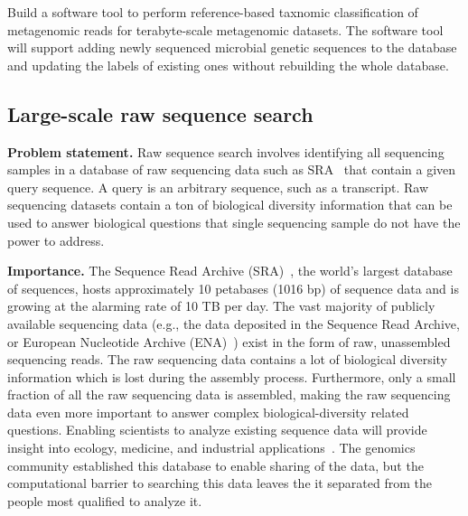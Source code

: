 \begin{rproblem}
Build a software tool to perform reference-based taxnomic classification of metagenomic reads for terabyte-scale metagenomic datasets. The software tool will support adding newly sequenced microbial genetic sequences to the database and updating the labels of existing ones without rebuilding the whole database.
\label{rprob:taxo-meta}
\end{rproblem}



\subsection{Large-scale raw sequence search}

{\bf Problem statement.} Raw sequence search involves identifying all sequencing samples in a database of raw sequencing data such as SRA~\cite{kodama2012sequence,KatzSLKBO22} that contain a given query sequence. A query is an arbitrary sequence, such as a transcript. Raw sequencing datasets contain a ton of biological diversity information that can be used to answer biological questions that single sequencing sample do not have the power to address.

\noindent
{\bf Importance.}
The Sequence Read Archive (SRA)~\cite{kodama2012sequence}, the world’s largest database of sequences, hosts approximately 10 petabases (1016 bp) of sequence data and is growing at the alarming rate of 10 TB per day.
%
The vast majority of publicly available sequencing data (e.g., the data deposited in the Sequence Read Archive, or European Nucleotide Archive (ENA)~\cite{CumminsAABDEGHH22}) exist in the form of raw, unassembled sequencing reads. The raw sequencing data contains a lot of biological diversity information which is lost during the assembly process. Furthermore, only a small fraction of all the raw sequencing data is assembled, making the raw sequencing data even more important to answer complex biological-diversity related questions.
%
Enabling scientists to analyze existing sequence data will provide insight into ecology, medicine, and industrial applications~\cite{LeviRAE18}.
%
The genomics community established this database to enable sharing of the data, but the computational barrier to searching this data leaves the it separated from the people most qualified to analyze it.

